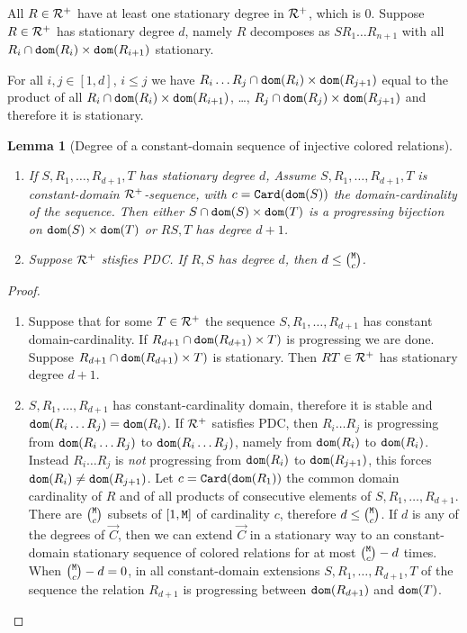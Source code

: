 \documentclass{lmcs}
\newtheorem{lemma}[theorem]{Lemma}
\begin{document}
All $R \in {\mathcal R}^+$ have at least one stationary degree in ${\mathcal R}^+$, which is $0$. 
Suppose $R  \in {\mathcal R}^+$ has stationary degree $d$, namely $R$ decomposes as 
$S R_1 \ldots R_{n+1}$ with all $R_i \cap {\tt dom}(R_i) \times {\tt dom}(R_{i+1})$
stationary. 

For all $i, j \in [1,d]$, $i \le j$ we have $R_i \ldots R_j \cap {\tt dom}(R_i) \times {\tt dom}(R_{j+1})$
equal to the product of all $R_i \cap {\tt dom}(R_i) \times {\tt dom}(R_{i+1})$, 
\ldots, $R_j \cap {\tt dom}(R_j) \times {\tt dom}(R_{j+1})$ and therefore it is stationary.




\begin{lemma}[Degree of a constant-domain sequence of injective colored relations]
\label{lemma-degree-constant}
\begin{enumerate}

\item
If $S, R_1, \ldots, R_{d+1},T$ has stationary degree $d$,
Assume $S, R_1, \ldots, R_{d+1},T$ is constant-domain ${\mathcal R}^+$-sequence, with 
$c = {\tt Card}({\tt dom}(S))$ the domain-cardinality of the sequence. Then either 
$S \cap {\tt dom}(S) \times {\tt dom}(T)$ is a progressing bijection on ${\tt dom}(S) \times {\tt dom}(T)$
or $RS, T$ has degree $d+1$.

\item
Suppose ${\mathcal R}^+$ stisfies PDC.
If $R,S$ has degree $d$, then $d \le \newton{\MaxInd}{c}$.
\end{enumerate}
\end{lemma}

\begin{proof}
\begin{enumerate}
\item
Suppose that for
some $ T \in {\mathcal R}^+$ the sequence $S, R_1, \ldots, R_{d+1}$ has constant domain-cardinality.
If $R_{d+1} \cap {\tt dom}(R_{d+1}) \times T)$ is progressing we are done.
Suppose $R_{d+1} \cap {\tt dom}(R_{d+1}) \times T)$ is stationary. 
Then $RT \in {\mathcal R}^+$ has stationary degree $d+1$.

\item
$S, R_1, \ldots, R_{d+1}$ has constant-cardinality domain, therefore it is stable
and ${\tt dom}(R_i \ldots R_j) = {\tt dom}(R_i)$. If ${\mathcal R}^+$ satisfies PDC, then 
$R_i \ldots R_j$ is progressing from ${\tt dom}(R_i \ldots R_j)$ to ${\tt dom}(R_i \ldots R_j)$,
namely from  ${\tt dom}(R_i)$ to ${\tt dom}(R_i)$. Instead $R_i \ldots R_j$ is \emph{not}
progressing from  ${\tt dom}(R_i)$ to ${\tt dom}(R_{j+1})$, this forces 
${\tt dom}(R_i) \not = {\tt dom}(R_{j+1})$.
Let $c = {\tt Card}({\tt dom}(R_1))$ the common 
domain cardinality of $R$ and of all products of consecutive elements of 
$S, R_1, \ldots, R_{d+1}$. 
There are $\newton{\MaxInd}{c}$ subsets of $[1,{\tt M}]$
of cardinality $c$, therefore $d \le \newton{\MaxInd}{c}$. 
If $d$ is any of the degrees of
$\vec{C}$, then we can extend $\vec{C}$ in a stationary way to 
an constant-domain stationary sequence of colored relations for at most
$\newton{\MaxInd}{c}-d$ times. When $\newton{\MaxInd}{c}-d=0$, in 
all constant-domain extensions $S, R_1, \ldots, R_{d+1},T$ of the sequence
the relation $R_{d+1}$ is progressing between ${\tt dom}(R_{d+1})$ and ${\tt dom}(T)$.
\end{enumerate}
\end{proof}
\end{document}
